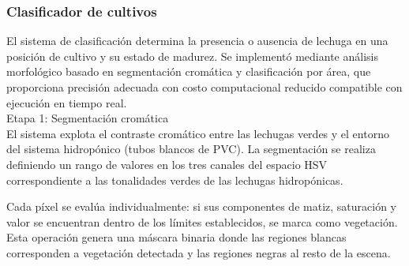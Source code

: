 \subsubsection{Clasificador de cultivos}

El sistema de clasificación determina la presencia o ausencia de lechuga en una posición de cultivo y su estado de madurez. Se implementó mediante análisis morfológico basado en segmentación cromática y clasificación por área, que proporciona precisión adecuada con costo computacional reducido compatible con ejecución en tiempo real.\\

Etapa 1: Segmentación cromática\\
\noindent
El sistema explota el contraste cromático entre las lechugas verdes y el entorno del sistema hidropónico (tubos blancos de PVC). La segmentación se realiza definiendo un rango de valores en los tres canales del espacio HSV correspondiente a las tonalidades verdes de las lechugas hidropónicas.

Cada píxel se evalúa individualmente: si sus componentes de matiz, saturación y valor se encuentran dentro de los límites establecidos, se marca como vegetación. Esta operación genera una máscara binaria donde las regiones blancas corresponden a vegetación detectada y las regiones negras al resto de la escena.

